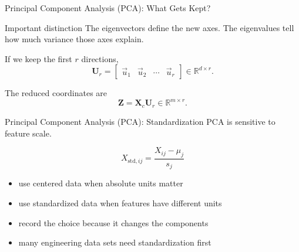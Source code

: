 \documentclass[aspectratio=169]{beamer}
\newcommand{\mat}[1]{\mathbf{#1}}
\newcommand{\vct}[1]{\vec{#1}}
\begin{document}
\begin{frame}{Principal Component Analysis (PCA): What Gets Kept?}
\small
\begin{block}{Important distinction}
The eigenvectors define the new axes. The eigenvalues tell how much variance those axes explain.
\end{block}

\vspace{0.4em}
If we keep the first $r$ directions,
\begin{equation*}
    \mat{U}_{r}
    =
    \begin{bmatrix}
    \vct{u}_1 & \vct{u}_2 & \cdots & \vct{u}_r
    \end{bmatrix}
    \in \mathbb{R}^{d\times r}.
\end{equation*}

The reduced coordinates are
\begin{equation*}
    \mat{Z}=\mat{X}_{c}\mat{U}_{r}\in\mathbb{R}^{m\times r}.
\end{equation*}
\end{frame}

\begin{frame}{Principal Component Analysis (PCA): Standardization}
\small
PCA is sensitive to feature scale.

\vspace{0.5em}
\begin{equation*}
    X_{\mathrm{std},ij}
    =
    \frac{X_{ij}-\mu_j}{s_j}
\end{equation*}

\vspace{0.5em}
\begin{itemize}
\item use centered data when absolute units matter
\item use standardized data when features have different units
\item record the choice because it changes the components
\item many engineering data sets need standardization first
\end{itemize}
\end{frame}
\end{document}
